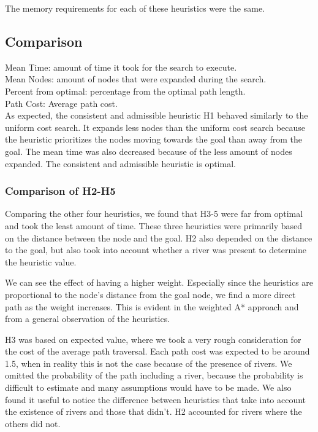 The memory requirements for each of these heuristics were the same.

\subsection{Comparison}

Mean Time: amount of time it took for the search to execute. \\
Mean Nodes: amount of nodes that were expanded during the search. \\
Percent from optimal: percentage from the optimal path length. \\ 
Path Cost: Average path cost. \\

As expected, the consistent and admissible heuristic H1 behaved similarly to the uniform cost search. It expands less nodes than the uniform cost search because the heuristic prioritizes the nodes moving towards the goal than away from the goal. The mean time was also decreased because of the less amount of nodes expanded.
The consistent and admissible heuristic is optimal.

\subsubsection{Comparison of H2-H5}
Comparing the other four heuristics, we found that H3-5 were far from optimal and took the least amount of time. These three heuristics were primarily based on the distance between the node and the goal. H2 also depended on the distance to the goal, but also took into account whether a river was present to determine the heuristic value.

We can see the effect of having a higher weight. Especially since the heuristics are proportional to the node's distance from the goal node, we find a more direct path as the weight increases. This is evident in the weighted A* approach and from a general observation of the heuristics.

H3 was based on expected value, where we took a very rough consideration for the cost of the average path traversal. Each path cost was expected to be around 1.5, when in reality this is not the case because of the presence of rivers. We omitted the probability of the path including a river, because the probability is difficult to estimate and many assumptions would have to be made. We also found it useful to notice the difference between heuristics that take into account the existence of rivers and those that didn't. H2 accounted for rivers where the others did not.

